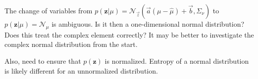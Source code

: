 \documentclass{article}         %
\theoremstyle{definition}
\theoremstyle{remark}
\begin{document}
The change of variables from $p\left(\mathbf{z}|\mu\right) = \mathcal{N}_{\vec{z}}\left(\vec{a}\left(\mu-\hat{\mu}\right)+\vec{b},\Sigma_\nu\right)$ to $p\left(\mathbf{z}|\mu\right) = \mathcal{N}_\mu$ is ambiguous. Is it then a one-dimensional normal distribution? Does this treat the complex element correctly? It may be better to investigate the complex normal distribution from the start.

Also, need to ensure that $p\left(\mathbf{z}\right)$ is normalized. Entropy of a normal distribution is likely different for an unnormalized distribution.
\end{document}
